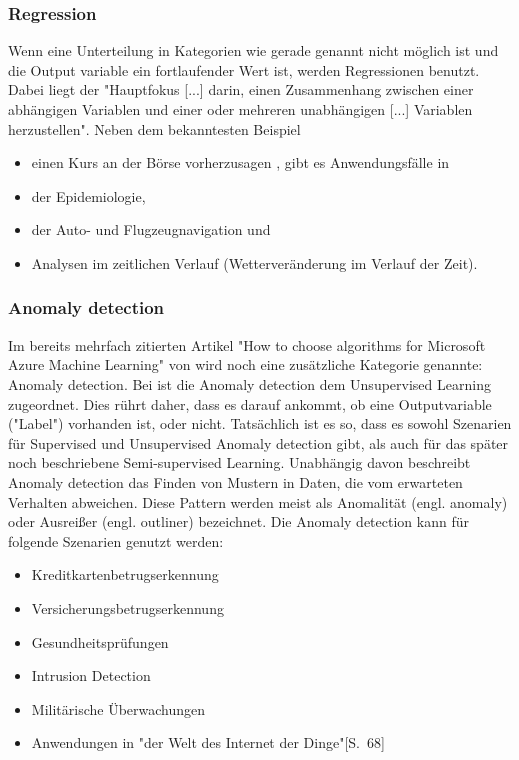 \subsubsection{Regression}\label{subsubsec:regression}
Wenn eine Unterteilung in Kategorien wie gerade genannt nicht möglich ist und die Output variable ein fortlaufender  Wert ist, werden Regressionen benutzt. Dabei liegt der "Hauptfokus [...] darin, einen Zusammenhang zwischen einer abhängigen Variablen und einer oder mehreren unabhängigen [...] Variablen herzustellen"\citep[S.~60; eigene Übersetzung]{swamynathan_mastering_2017}. Neben dem bekanntesten Beispiel
\begin{itemize}
\item einen Kurs an der Börse vorherzusagen , gibt es Anwendungsfälle in
\item der Epidemiologie,
\item der Auto- und Flugzeugnavigation und
\item Analysen im zeitlichen Verlauf (Wetterveränderung im Verlauf der Zeit)\citep[S.~5]{kauchak_zoterovoll2.pdf_2016}.
\end{itemize}

\subsubsection{Anomaly detection}
Im bereits mehrfach zitierten Artikel "How to choose algorithms for Microsoft Azure Machine Learning" von \citep{ericson_how_2017} wird noch eine zusätzliche Kategorie genannte: Anomaly detection. Bei \citep[S.~68]{swamynathan_mastering_2017} ist die Anomaly detection dem Unsupervised Learning zugeordnet. Dies rührt daher, dass es darauf ankommt, ob eine Outputvariable ("Label") vorhanden ist, oder nicht. Tatsächlich ist es so, dass es sowohl Szenarien für Supervised und Unsupervised Anomaly detection gibt, als auch für das später noch beschriebene Semi-supervised Learning.\citep[S.~15:10]{chandola_anomaly_2009}
Unabhängig davon beschreibt Anomaly detection das Finden von Mustern in Daten, die vom erwarteten Verhalten abweichen. Diese Pattern werden meist als Anomalität (engl. anomaly) oder Ausreißer (engl. outliner) bezeichnet.\citep[S.~15:1]{chandola_anomaly_2009}
Die Anomaly detection kann für folgende Szenarien genutzt werden\citep[S.~15:2]{chandola_anomaly_2009}:
\begin{itemize}
\item Kreditkartenbetrugserkennung
\item Versicherungsbetrugserkennung
\item Gesundheitsprüfungen
\item Intrusion Detection
\item Militärische Überwachungen
\item Anwendungen in "der Welt des Internet der Dinge"[S.~68]\citep{swamynathan_mastering_2017}
\end{itemize}

